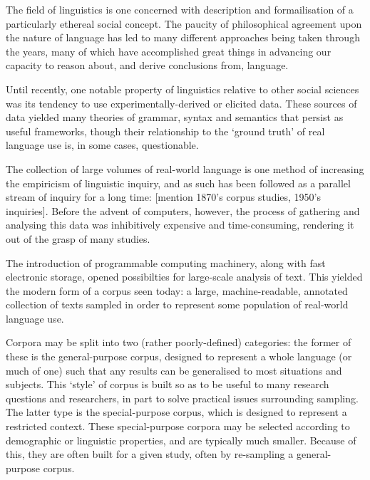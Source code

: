 

The field of linguistics is one concerned with description and formailisation of a particularly ethereal social concept.  The paucity of philosophical agreement upon the nature of language has led to many different approaches being taken through the years, many of which have accomplished great things in advancing our capacity to reason about, and derive conclusions from, language.

Until recently, one notable property of linguistics relative to other social sciences was its tendency to use experimentally-derived or elicited data.  These sources of data yielded many theories of grammar, syntax and semantics that persist as useful frameworks, though their relationship to the `ground truth' of real language use is, in some cases, questionable.

The collection of large volumes of real-world language is one method of increasing the empiricism of linguistic inquiry, and as such has been followed as a parallel stream of inquiry for a long time: [mention 1870's corpus studies, 1950's inquiries].  Before the advent of computers, however, the process of gathering and analysing this data was inhibitively expensive and time-consuming, rendering it out of the grasp of many studies.

The introduction of programmable computing machinery, along with fast electronic storage, opened possibilties for large-scale analysis of text.  This yielded the modern form of a corpus seen today: a large, machine-readable, annotated collection of texts sampled in order to represent some population of real-world language use.

Corpora may be split into two (rather poorly-defined) categories: the former of these is the general-purpose corpus, designed to represent a whole language (or much of one) such that any results can be generalised to most situations and subjects.  This `style' of corpus is built so as to be useful to many research questions and researchers, in part to solve practical issues surrounding sampling.  The latter type is the special-purpose corpus, which is designed to represent a restricted context.  These special-purpose corpora may be selected according to demographic or linguistic properties, and are typically much smaller.  Because of this, they are often built for a given study, often by re-sampling a general-purpose corpus.




